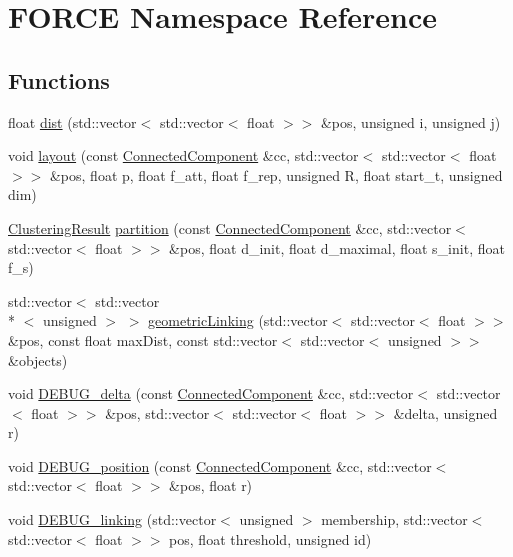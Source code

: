 \hypertarget{namespaceFORCE}{\section{F\-O\-R\-C\-E Namespace Reference}
\label{namespaceFORCE}
}
\subsection*{Functions}
\begin{DoxyCompactItemize}
\item 
float \hyperlink{namespaceFORCE_aa98e605135ced38fe09c8c97a2597af0}{dist} (std\-::vector$<$ std\-::vector$<$ float $>$$>$ \&pos, unsigned i, unsigned j)
\item 
void \hyperlink{namespaceFORCE_a98853866c9b35b686d06faaeaffedff4}{layout} (const \hyperlink{classConnectedComponent}{Connected\-Component} \&cc, std\-::vector$<$ std\-::vector$<$ float $>$$>$ \&pos, float p, float f\-\_\-att, float f\-\_\-rep, unsigned R, float start\-\_\-t, unsigned dim)
\item 
\hyperlink{classClusteringResult}{Clustering\-Result} \hyperlink{namespaceFORCE_a0c6a6dbc5e4c7cc9d9c33dd884034941}{partition} (const \hyperlink{classConnectedComponent}{Connected\-Component} \&cc, std\-::vector$<$ std\-::vector$<$ float $>$$>$ \&pos, float d\-\_\-init, float d\-\_\-maximal, float s\-\_\-init, float f\-\_\-s)
\item 
std\-::vector$<$ std\-::vector\\*
$<$ unsigned $>$ $>$ \hyperlink{namespaceFORCE_ac58f3224b8bcfdce18f57ed692278f00}{geometric\-Linking} (std\-::vector$<$ std\-::vector$<$ float $>$$>$ \&pos, const float max\-Dist, const std\-::vector$<$ std\-::vector$<$ unsigned $>$$>$ \&objects)
\item 
void \hyperlink{namespaceFORCE_a4757f1fe7991d161f1deb3dafa1b933e}{D\-E\-B\-U\-G\-\_\-delta} (const \hyperlink{classConnectedComponent}{Connected\-Component} \&cc, std\-::vector$<$ std\-::vector$<$ float $>$$>$ \&pos, std\-::vector$<$ std\-::vector$<$ float $>$$>$ \&delta, unsigned r)
\item 
void \hyperlink{namespaceFORCE_a2a8c27faac3bf131cbf45212b723286e}{D\-E\-B\-U\-G\-\_\-position} (const \hyperlink{classConnectedComponent}{Connected\-Component} \&cc, std\-::vector$<$ std\-::vector$<$ float $>$$>$ \&pos, float r)
\item 
void \hyperlink{namespaceFORCE_a91fbcba5dd9ef801ef9c1b145722d7e1}{D\-E\-B\-U\-G\-\_\-linking} (std\-::vector$<$ unsigned $>$ membership, std\-::vector$<$ std\-::vector$<$ float $>$$>$ pos, float threshold, unsigned id)
\end{DoxyCompactItemize}


